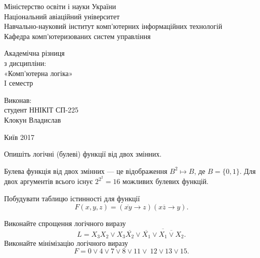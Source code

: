 \documentclass[a4paper,oneside,DIV=10,12pt]{scrartcl}
\renewcommand{\implies}{\rightarrow}
\newcommand\barneg[1]{\overline{#1}}
\begin{document}
	\begin{titlepage}
		\begin{center}
			Міністерство освіти і науки України\\
			Національний авіаційний університет\\
			Навчально-науковий інститут комп'ютерних інформаційних технологій\\
			Кафедра комп'ютеризованих систем управління
			
			\vspace{\fill}
				Академічна різниця\\
				з дисципліни:\\
				«Комп'ютерна логіка»\\
				I семестр
				
			\vspace{\fill}
			
			\begin{flushright}
				Виконав:\\
				студент ННІКІТ СП-225\\
				Клокун Владислав\\
			\end{flushright}
			Київ 2017
		\end{center}
	\end{titlepage}
	
	\begin{exercise}
		Опишіть логічні (булеві) функції від двох змінних.
	\end{exercise}
	
	\begin{solution}	
		Булева функція від двох змінних --- це відображення $B^2 \mapsto B$, де $B = \{0, 1\}$. Для двох аргументів всього існує $2^{2^2} = 16$ можливих булевих функцій. 
	\end{solution}
	
	\begin{exercise}
		Побудувати таблицю істинності для функції
		\[
			F(x, y, z) = \left( \barneg{xy} \implies z\right) \left( x \barneg{z} \implies y \right).
		\]
	\end{exercise}
	
	\begin{exercise}
		Виконайте спрощення логічного виразу
		\[
			L = X_3X_2 \lor X_3 \barneg{X_2} \lor \barneg{\barneg{X_1} \lor \barneg{X_1 \lor X_2} }.
		\]
		Виконайте мінімізацію логічного виразу
		\[
			F = 0 \lor 4 \lor 7 \lor 8 \lor 11 \lor\ 12 \lor 13 \lor 15.
		\]
	\end{exercise}
	
\end{document}
